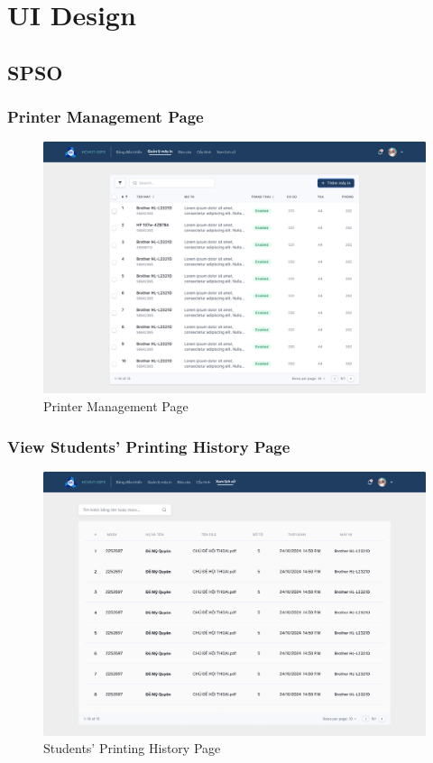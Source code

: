 \newpage
\section{UI Design}
\subsection{SPSO}
\subsubsection{Printer Management Page}
\begin{figure}[htbp]
     \centering
     \includegraphics[width=1\linewidth]{Images/UI/Printer_Management.png}
     \caption{Printer Management Page}
 \end{figure} 
\newpage
\subsubsection{View Students' Printing History Page}

\begin{figure}[htbp]
     \centering
     \includegraphics[width=1\linewidth]{Images/UI/View_student's_history_page.png}
     \caption{Students' Printing History Page}
 \end{figure}
\newpage
